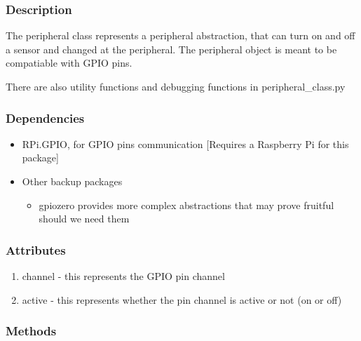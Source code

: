\documentclass[
]{article}
\providecommand{\tightlist}{%
  \setlength{\itemsep}{0pt}\setlength{\parskip}{0pt}}
\begin{document}
\hypertarget{description-1}{%
\subsubsection{Description}\label{description-1}}

The peripheral class represents a peripheral abstraction, that can turn
on and off a sensor and changed at the peripheral. The peripheral object
is meant to be compatiable with GPIO pins.

There are also utility functions and debugging functions in
peripheral\_class.py

\hypertarget{dependencies-2}{%
\subsubsection{Dependencies}\label{dependencies-2}}

\begin{itemize}
\tightlist
\item
  RPi.GPIO, for GPIO pins communication {[}Requires a Raspberry Pi for
  this package{]}
\item
  Other backup packages

  \begin{itemize}
  \tightlist
  \item
    gpiozero provides more complex abstractions that may prove fruitful
    should we need them
  \end{itemize}
\end{itemize}

\hypertarget{attributes-1}{%
\subsubsection{Attributes}\label{attributes-1}}

\begin{enumerate}
\def\labelenumi{\arabic{enumi}.}
\tightlist
\item
  channel - this represents the GPIO pin channel
\item
  active - this represents whether the pin channel is active or not (on
  or off)
\end{enumerate}

\hypertarget{methods-1}{%
\subsubsection{Methods}\label{methods-1}}
\end{document}
